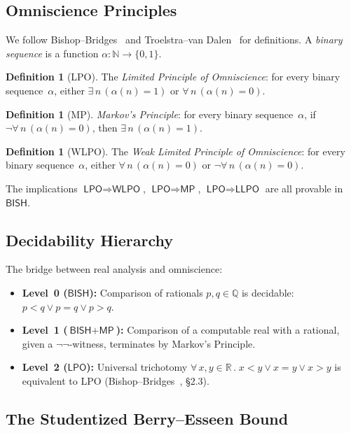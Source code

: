 \documentclass[11pt,a4paper]{article}
\theoremstyle{plain}
\theoremstyle{definition}
\newtheorem{definition}[theorem]{Definition}
\newcommand{\BISH}{\textsf{BISH}}
\newcommand{\WLPO}{\textsf{WLPO}}
\newcommand{\LLPO}{\textsf{LLPO}}
\newcommand{\LPO}{\textsf{LPO}}
\newcommand{\MP}{\textsf{MP}}
\newcommand{\Q}{\mathbb{Q}}
\newcommand{\R}{\mathbb{R}}
\newcommand{\N}{\mathbb{N}}
\begin{document}
\subsection{Omniscience Principles}

We follow Bishop--Bridges~\cite{bishop-bridges} and Troelstra--van Dalen~\cite{troelstra-vandalen} for definitions.  A \emph{binary sequence} is a function $\alpha : \N \to \{0,1\}$.

\begin{definition}[LPO]
The \emph{Limited Principle of Omniscience}: for every binary sequence~$\alpha$, either $\exists\, n\,(\alpha(n) = 1)$ or $\forall\, n\,(\alpha(n) = 0)$.
\end{definition}

\begin{definition}[MP]
\emph{Markov's Principle}: for every binary sequence~$\alpha$, if $\lnot\forall\, n\,(\alpha(n)=0)$, then $\exists\, n\,(\alpha(n)=1)$.
\end{definition}

\begin{definition}[WLPO]
The \emph{Weak Limited Principle of Omniscience}: for every binary sequence~$\alpha$, either $\forall\, n\,(\alpha(n)=0)$ or $\lnot\forall\, n\,(\alpha(n)=0)$.
\end{definition}

The implications $\LPO \Rightarrow \WLPO$, $\LPO \Rightarrow \MP$, $\LPO \Rightarrow \LLPO$ are all provable in $\BISH$.

\subsection{Decidability Hierarchy}

The bridge between real analysis and omniscience:
\begin{itemize}[nosep]
\item \textbf{Level~0 ($\BISH$):} Comparison of rationals $p, q \in \Q$ is decidable: $p < q \lor p = q \lor p > q$.
\item \textbf{Level~1 ($\BISH + \MP$):} Comparison of a computable real with a rational, given a $\lnot\lnot$-witness, terminates by Markov's Principle.
\item \textbf{Level~2 ($\LPO$):} Universal trichotomy $\forall\, x, y \in \R\,.\; x < y \lor x = y \lor x > y$ is equivalent to LPO (Bishop--Bridges~\cite{bishop-bridges}, \S2.3).
\end{itemize}

\subsection{The Studentized Berry--Esseen Bound}
\end{document}
